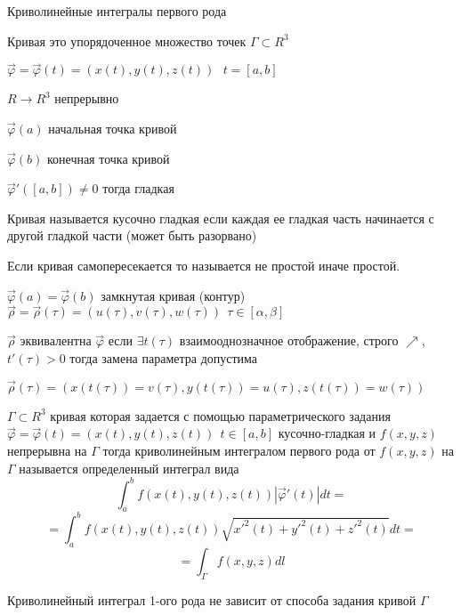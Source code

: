 \begin{title}[\Large]
  Криволинейные интегралы первого рода
\end{title}

\begin{block}[Кривая]
  Кривая это упорядоченное множество точек $\Gamma \subset R^3$

  $\vec \varphi = \vec \varphi(t) = (x(t), y(t), z(t)) ~~~ t = [a,b]$

  $R \to R^3$ непрерывно

  $\vec \varphi(a)$ начальная точка кривой

  $\vec \varphi(b)$ конечная точка кривой

  $\vec \varphi'([a,b]) \not= 0$ тогда гладкая

  Кривая называется кусочно гладкая если каждая ее гладкая часть начинается с
  другой гладкой части (может быть разорвано)

  Если кривая самопересекается то называется не простой иначе простой.

  $\vec \varphi(a) = \vec \varphi(b)$ замкнутая кривая (контур)
  \\

  $\vec \rho = \vec \rho(\tau) = (u(\tau), v(\tau), w(\tau)) ~~
  \tau \in [\alpha, \beta]$

  $\vec \rho$ эквивалентна $\vec \varphi$ если $\exists t(\tau)$
  взаимооднозначное отображение, строго $\nearrow$, $t'(\tau) > 0$ тогда замена
  параметра допустима

  $\vec \rho(\tau) = (x(t(\tau)) = v(\tau), y(t(\tau)) = u(\tau),
  z(t(\tau)) = w(\tau))$
\end{block}

\begin{define}
  $\Gamma \subset R^3$ кривая которая задается с помощью параметрического
  задания $\vec \varphi = \vec \varphi(t) =
  (x(t), y(t), z(t)) ~~ t \in [a,b]$ кусочно-гладкая и $f(x,y,z)$ непрерывна
  на $\Gamma$ тогда
  криволинейным интегралом первого рода от $f(x,y,z)$ на $\Gamma$ называется
  определенный интеграл вида
  $$
  \int_a^b f(x(t), y(t), z(t))|\vec \varphi'(t)|dt =
  $$
  $$
  = \int_a^b f(x(t), y(t), z(t)) \sqrt{x'^2(t) + y'^2(t) + z'^2(t)} dt =
  $$
  $$
  = \int_{\Gamma} f(x,y,z) d l
  $$
\end{define}

\begin{theorem}
  Криволинейный интеграл 1-ого рода не зависит от способа задания кривой
  $\Gamma$
\end{theorem}

